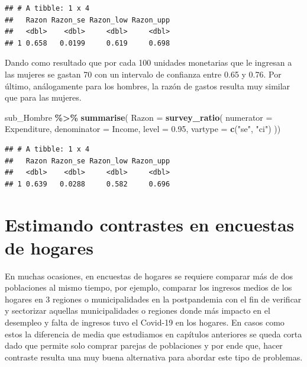 \documentclass[
  12pt,
]{book}
\newenvironment{Shaded}{\begin{snugshade}}{\end{snugshade}}
\newcommand{\AttributeTok}[1]{\textcolor[rgb]{0.13,0.29,0.53}{#1}}
\newcommand{\FloatTok}[1]{\textcolor[rgb]{0.00,0.00,0.81}{#1}}
\newcommand{\FunctionTok}[1]{\textcolor[rgb]{0.13,0.29,0.53}{\textbf{#1}}}
\newcommand{\NormalTok}[1]{#1}
\newcommand{\SpecialCharTok}[1]{\textcolor[rgb]{0.81,0.36,0.00}{\textbf{#1}}}
\newcommand{\StringTok}[1]{\textcolor[rgb]{0.31,0.60,0.02}{#1}}
\begin{document}
\begin{verbatim}
## # A tibble: 1 x 4
##   Razon Razon_se Razon_low Razon_upp
##   <dbl>    <dbl>     <dbl>     <dbl>
## 1 0.658   0.0199     0.619     0.698
\end{verbatim}

Dando como resultado que por cada 100 unidades monetarias que le ingresan a las mujeres se gastan 70 con un intervalo de confianza entre 0.65 y 0.76. Por último, análogamente para los hombres, la razón de gastos resulta muy similar que para las mujeres.

\begin{Shaded}
\begin{Highlighting}[]
\NormalTok{sub\_Hombre }\SpecialCharTok{\%\textgreater{}\%} \FunctionTok{summarise}\NormalTok{(}
    \AttributeTok{Razon =}  \FunctionTok{survey\_ratio}\NormalTok{(}
      \AttributeTok{numerator =}\NormalTok{ Expenditure,}
      \AttributeTok{denominator =}\NormalTok{ Income,}
      \AttributeTok{level =} \FloatTok{0.95}\NormalTok{,}
    \AttributeTok{vartype =}  \FunctionTok{c}\NormalTok{(}\StringTok{"se"}\NormalTok{, }\StringTok{"ci"}\NormalTok{)}
\NormalTok{    ))}
\end{Highlighting}
\end{Shaded}

\begin{verbatim}
## # A tibble: 1 x 4
##   Razon Razon_se Razon_low Razon_upp
##   <dbl>    <dbl>     <dbl>     <dbl>
## 1 0.639   0.0288     0.582     0.696
\end{verbatim}

\section{Estimando contrastes en encuestas de hogares}\label{estimando-contrastes-en-encuestas-de-hogares}

En muchas ocasiones, en encuestas de hogares se requiere comparar más de dos poblaciones al mismo tiempo, por ejemplo, comparar los ingresos medios de los hogares en 3 regiones o municipalidades en la postpandemia con el fin de verificar y sectorizar aquellas municipalidades o regiones donde más impacto en el desempleo y falta de ingresos tuvo el Covid-19 en los hogares. En casos como estos la diferencia de media que estudiamos en capítulos anteriores se queda corta dado que permite solo comprar parejas de poblaciones y por ende que, hacer contraste resulta una muy buena alternativa para abordar este tipo de problemas.
\end{document}
